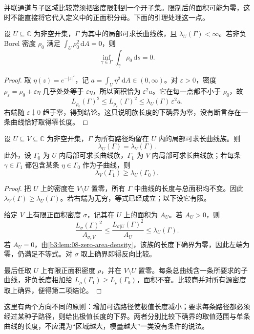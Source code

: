 \ProseParagraphBreak
并联通道与子区域比较常须把密度限制到一个开子集。限制后的面积可能为零，这时不能直接将它代入定义中的正面积分母。下面的引理处理这一点。

\begin{lemma}[零面积密度]\label{b3:lem:08-zero-area-density}
设 \(U\subseteq\mathbb C\) 为非空开集，\(\Gamma\) 为其中的局部可求长曲线族，且 \(\lambda_U(\Gamma)<\infty\)。若非负 Borel 密度 \(\rho_0\) 满足 \(\int_U\rho_0^2\,\mathrm dA=0\)，则
\[
 \inf_{\gamma\in\Gamma}\int_\gamma\rho_0\,\mathrm ds=0.
\]
\end{lemma}
\begin{proof}
取 \(\eta(z)=e^{-|z|^2}\)，记 \(a=\int_U\eta^2\,\mathrm dA\in(0,\infty)\)。对 \(\varepsilon>0\)，密度
\(\rho_\varepsilon=\rho_0+\varepsilon\eta\) 几乎处处等于 \(\varepsilon\eta\)，所以面积恰为 \(\varepsilon^2a\)。它在每一点都不小于 \(\rho_0\)，故
\[
 L_{\rho_0}(\Gamma)^2
 \le L_{\rho_\varepsilon}(\Gamma)^2
 \le\lambda_U(\Gamma)\,\varepsilon^2a.
\]
右端随 \(\varepsilon\downarrow0\) 趋于零，得到结论。这只说明族长度的下确界为零，没有断言存在一条曲线恰好取得零长度。
\end{proof}

\begin{proposition}[扩大环境与必经子曲线]\label{b3:prop:08-ambient-independence}
设 \(U\subseteq V\subseteq\mathbb C\) 为非空开集，\(\Gamma\) 为所有路径均留在 \(U\) 内的局部可求长曲线族。则
\[
 \lambda_U(\Gamma)=\lambda_V(\Gamma).
\]
此外，设 \(\Gamma_0\) 为 \(U\) 内局部可求长曲线族，\(\Gamma_1\) 为 \(V\) 内局部可求长曲线族；若每条 \(\gamma\in\Gamma_1\) 都包含某条 \(\eta\in\Gamma_0\) 作为子曲线，则
\[
 \lambda_V(\Gamma_1)\ge\lambda_U(\Gamma_0).
\]
\end{proposition}
\begin{proof}
把 \(U\) 上的密度在 \(V\setminus U\) 置零，所有 \(\Gamma\) 中曲线的长度与总面积均不变。因此
\(\lambda_V(\Gamma)\ge\lambda_U(\Gamma)\)。若右端为无穷，等式已经成立；以下设它有限。

给定 \(V\) 上有限正面积密度 \(\sigma\)，记其在 \(U\) 上的面积为 \(A_U\)。若 \(A_U>0\)，则
\[
 \frac{L_\sigma(\Gamma)^2}{A_{\sigma,V}}
 \le\frac{L_{\sigma|U}(\Gamma)^2}{A_U}
 \le\lambda_U(\Gamma).
\]
若 \(A_U=0\)，由\cref{b3:lem:08-zero-area-density}，该族的长度下确界为零，因此左端为零，仍满足不等式。对 \(\sigma\) 取上确界即得反向比较。

最后任取 \(U\) 上有限正面积密度 \(\rho\)，并在 \(V\setminus U\) 置零。每条总曲线含一条所要求的子曲线，非负长度相加给
\(L_\rho(\Gamma_1)\ge L_\rho(\Gamma_0)\)，面积不变。比较商并对所有源密度取上确界，便得第二项结论。
\end{proof}
这里有两个方向不同的原则：增加可选路径使极值长度减小；要求每条路径都必须经过某种子路径，则给出极值长度的下界。两者分别比较下确界的取值范围与单条曲线的长度，不应混为“区域越大，模量越大”一类没有条件的说法。

